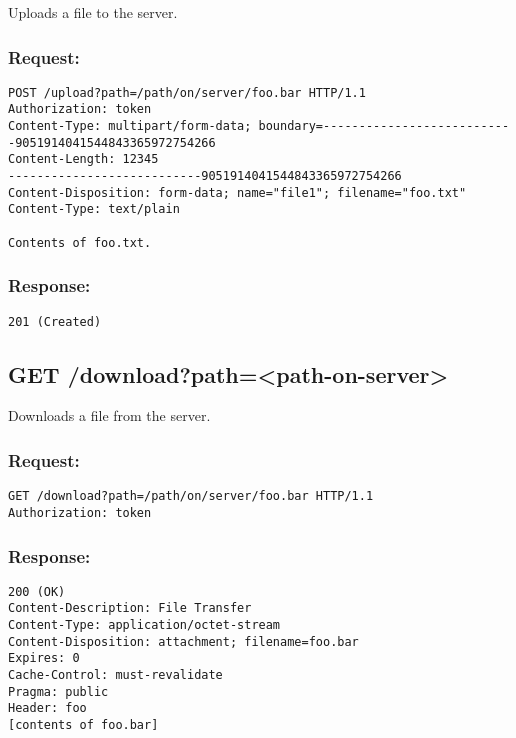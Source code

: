 Uploads a file to the server.

\subsubsection*{Request:}
\begin{verbatim}
POST /upload?path=/path/on/server/foo.bar HTTP/1.1
Authorization: token
Content-Type: multipart/form-data; boundary=---------------------------9051914041544843365972754266
Content-Length: 12345
---------------------------9051914041544843365972754266
Content-Disposition: form-data; name="file1"; filename="foo.txt"
Content-Type: text/plain

Contents of foo.txt.
\end{verbatim}

\subsubsection*{Response:}
\begin{verbatim}
201 (Created)
\end{verbatim}

\subsection*{GET /download?path=<path-on-server>}

Downloads a file from the server.

\subsubsection*{Request:}
\begin{verbatim}
GET /download?path=/path/on/server/foo.bar HTTP/1.1
Authorization: token
\end{verbatim}

\subsubsection*{Response:}
\begin{verbatim}
200 (OK)
Content-Description: File Transfer
Content-Type: application/octet-stream
Content-Disposition: attachment; filename=foo.bar
Expires: 0
Cache-Control: must-revalidate
Pragma: public
Header: foo
[contents of foo.bar]
\end{verbatim}
